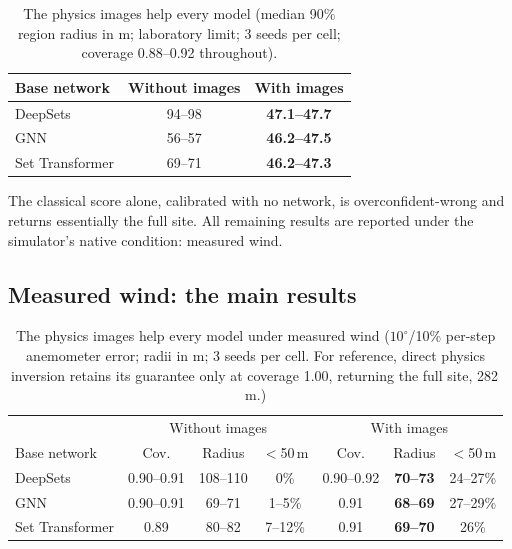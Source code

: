 \documentclass[conference]{IEEEtran}
\begin{document}
\begin{table}[t]
\centering
\caption{The physics images help every model (median 90\% region
radius in m; laboratory limit; 3 seeds per cell; coverage 0.88--0.92
throughout).}
\label{tab:est}
\begin{tabular}{lcc}
\toprule
Base network & Without images & With images \\
\midrule
DeepSets        & 94--98 & \textbf{47.1--47.7} \\
GNN             & 56--57 & \textbf{46.2--47.5} \\
Set Transformer & 69--71 & \textbf{46.2--47.3} \\
\bottomrule
\end{tabular}
\end{table} The classical score alone, calibrated with no network, is
overconfident-wrong and returns essentially the full site. All
remaining results are reported under the simulator's native condition:
measured wind.

\subsection{Measured wind: the main results}
\label{sec:robust}
\begin{table}[t]
\centering
\caption{The physics images help every model under measured wind
($10^\circ$/10\% per-step anemometer error; radii in m; 3 seeds per
cell. For reference, direct physics inversion retains its guarantee
only at coverage 1.00, returning the full site, 282\,m.)}
\label{tab:wind}
\setlength{\tabcolsep}{2.2pt}
\footnotesize
\begin{tabular}{lcccccc}
\toprule
 & \multicolumn{3}{c}{Without images} &
\multicolumn{3}{c}{With images} \\
Base network & Cov. & Radius & $<$50\,m & Cov. & Radius &
$<$50\,m \\
\midrule
DeepSets & 0.90--0.91 & 108--110 & 0\% & 0.90--0.92 &
\textbf{70--73} & 24--27\% \\
GNN & 0.90--0.91 & 69--71 & 1--5\% & 0.91 &
\textbf{68--69} & 27--29\% \\
Set Transformer & 0.89 & 80--82 & 7--12\% & 0.91 &
\textbf{69--70} & 26\% \\
\bottomrule
\end{tabular}
\end{table}
\end{document}
